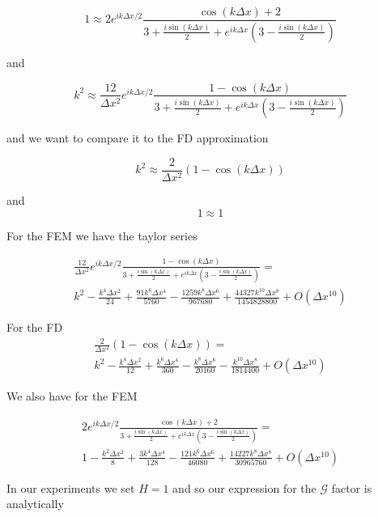 \documentclass[12pt]{article}
\begin{document}
\[1 \approx 2e^{ ik\Delta x/2} \frac{\cos \left(k\Delta x\right) + 2}{3   + \frac{i\sin\left(k\Delta x\right)}{2} + e^{ik\Delta x}\left(3   - \frac{i\sin\left(k\Delta x\right)}{2}\right)}\]

and 

\[k^2 \approx  \frac{12}{\Delta x^2} e^{ ik\Delta x/2}\frac{ 1 -  \cos \left(k\Delta x\right)}{3   + \frac{i\sin\left(k\Delta x\right)}{2} + e^{ik\Delta x}\left(3   - \frac{i\sin\left(k\Delta x\right)}{2}\right)}\]

and we want to compare it to the FD approximation

\[k^2 \approx  \frac{2}{\Delta x^2}\left(1  -\cos\left(k \Delta x\right)\right)\]

and 
\[1 \approx 1\]

For the FEM we have the taylor series

\begin{multline}
 \frac{12}{\Delta x^2} e^{ ik\Delta x/2}\frac{ 1 -  \cos \left(k\Delta x\right)}{3   + \frac{i\sin\left(k\Delta x\right)}{2} + e^{ik\Delta x}\left(3   - \frac{i\sin\left(k\Delta x\right)}{2}\right)} = \\ k^2 - \frac{k^4 \Delta x^2}{24} + \frac{91k^6 \Delta x^4}{5760} - \frac{1259k^{8} \Delta x^{6}}{967680} + \frac{44327k^{10} \Delta x^{8}}{1454828800} + O(\Delta x^{10})
\end{multline}


For the FD
\begin{multline}
\frac{2}{\Delta x^2}\left(1  -\cos\left(k \Delta x\right)\right) = \\ k^2 - \frac{k^4 \Delta x^2}{12} + \frac{k^6 \Delta x^4}{360} - \frac{k^8 \Delta x^6}{20160} - \frac{k^{10} \Delta x^{8}}{1814400} + O(\Delta x^{10})
\end{multline}


We also have for the FEM

\begin{multline}
2e^{ ik\Delta x/2} \frac{\cos \left(k\Delta x\right) + 2}{3   + \frac{i\sin\left(k\Delta x\right)}{2} + e^{ik\Delta x}\left(3   - \frac{i\sin\left(k\Delta x\right)}{2}\right)} = \\ 1 - \frac{k^2 \Delta x^2}{8} + \frac{3k^4 \Delta x^4}{128} - \frac{121 k^{6} \Delta x^{6}}{46080} + \frac{14227k^{8} \Delta x^{8}}{30965760} + O(\Delta x^{10})
\end{multline}

In our experiments we set $H = 1$ and so our expression for the $\mathcal{G}$ factor is analytically 
\end{document}
